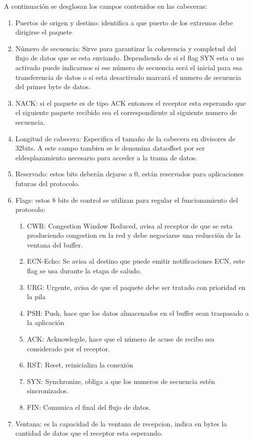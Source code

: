 \documentclass[a4paper,spanish,12pt]{book}
\begin{document}
A continuación se desglosan los campos contenidos en las cabeceras:
\begin{enumerate}
	\item{Puertos de origen y destino: identifica a que puerto de los extremos debe dirigirse el paquete}
	\item{Número de secuencia: Sirve para garantizar la coherencia y completud del flujo de datos que se esta enviando. Dependiendo de si el flag SYN esta o no activado puede indicarnos si ese número de secuencia será el inicial para esa transferencia de datos o si esta desactivado marcará el numero de secuencia del primer byte de datos.}
	\item{NACK: si el paquete es de tipo ACK entonces el receptor esta esperando que el siguiente paquete recibido sea el correspondiente al siguiente numero de secuencia.}
	\item{Longitud de cabecera: Especifica el tamaño de la cabecera en divisores de 32bits. A este campo tambien se le denomina dataoffset por ser eldesplazamiento necesario para acceder a la trama de datos.}
	\item{Reservado: estos bits deberán dejarse a 0, están reservados para aplicaciones futuras del protocolo.}
	\item{Flags: estos 8 bits de control se utilizan para regular el funcionamiento del protocolo:
		\begin{enumerate}
			\item{CWR: Congestion Window Reduced, avisa al receptor de que se esta produciendo congestion en la red y debe negociarse una reducción de la ventana del buffer.}
			\item{ECN-Echo: Se avisa al destino que puede emitir notificaciones ECN, este flag se usa durante la etapa de saludo.}
			\item{URG: Urgente, avisa de que el paquete debe ser tratado con prioridad en la pila}
			\item{PSH: Push, hace que los datos almacenados en el buffer sean traspasado a la aplicación}
			\item{ACK: Acknowlegde, hace que el número de acuse de recibo sea considerado por el receptor.}
			\item{RST: Reset, reinicializa la conexión}
			\item{SYN: Synchronize, obliga a que los numeros de secuencia est\'en sincronizados.}
			\item{FIN: Comunica el final del flujo de datos.}
		\end{enumerate}
	}
	\item{Ventana: es la capacidad de la ventana de recepcion, indica en bytes la cantidad de datos que el receptor esta esperando.}

\end{enumerate}
\end{document}
